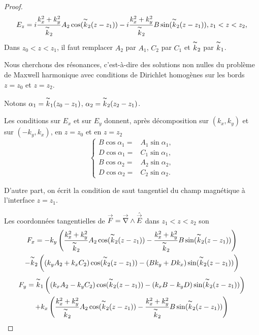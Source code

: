 \begin{proof}
    \[
    E_z=i\dfrac{k_x^2+k_y^2}{\overset{\thicksim}{k}_2}A_2\cos(\overset{\thicksim}{k}_2(z-z_1))-i\dfrac{k_x^2+k_y^2}{\overset{\thicksim}{k}_2}B\sin(\overset{\thicksim}{k}_2(z-z_1)), z_1<z<z_2,
    \]
    Dans \(z_0<z<z_1\), il faut remplacer \(A_2\) par \(A_1\), \(C_2\) par \(C_1\) et \(\overset{\thicksim}{k}_2\) par \(\overset{\thicksim}{k}_1\).

    Nous cherchons des résonances, c'est-à-dire des solutions non nulles du problème de Maxwell harmonique avec conditions de Dirichlet homogènes sur les bords \(z=z_0\) et \(z=z_2\).

    Notons \(\alpha_1=\overset{\thicksim}{k}_1(z_0-z_1)\), \(\alpha_2=\overset{\thicksim}{k}_2(z_2-z_1)\).

    Les conditions sur \(E_x\) et sur \(E_y\) donnent, après décomposition sur \((k_x,k_y)\) et sur \((-k_y,k_x)\), en \(z=z_0\) et en \(z=z_2\)
    \[
    \left\{
    \begin{aligned}
    B\cos \alpha_1={}& A_1\sin \alpha_1,
    \\
    D\cos \alpha_1={}& C_1\sin \alpha_1,
    \\
    B\cos \alpha_2={}& A_2\sin \alpha_2,
    \\
    D\cos \alpha_2={}& C_2\sin \alpha_2.
    \end{aligned}
    \right.
    \]

    D'autre part, on écrit la condition de saut tangentiel du champ magnétique à l'interface \(z=z_1\).

    Les coordonnées tangentielles de \({\overset{\rightarrow}{F}} = {\overset{\rightarrow}{\nabla}}\wedge \hat{{\overset{\rightarrow}{E}}}\) dans \(z_1<z<z_2\) son
    \begin{multline*}
    F_x = -k_y\left(\dfrac{k_x^2+k_y^2}{\overset{\thicksim}{k}_2}A_2\cos(\overset{\thicksim}{k}_2(z-z_1))-\dfrac{k_x^2+k_y^2}{\overset{\thicksim}{k}_2}B\sin(\overset{\thicksim}{k}_2(z-z_1))\right)
    \\
    -\overset{\thicksim}{k}_2\left((k_yA_2+k_xC_2)\cos(\overset{\thicksim}{k}_2(z-z_1))-(Bk_y+Dk_x)\sin(\overset{\thicksim}{k}_2(z-z_1))\right)
    \end{multline*}
    \begin{multline*}
    F_y = \overset{\thicksim}{k}_1\left((k_xA_2-k_yC_2)\cos(\overset{\thicksim}{k}_2(z-z_1))-(k_xB-k_yD)\sin(\overset{\thicksim}{k}_2(z-z_1))\right)
    \\
    +k_x\left(\dfrac{k_x^2+k_y^2}{\overset{\thicksim}{k}_2}A_2\cos(\overset{\thicksim}{k}_2(z-z_1))-\dfrac{k_x^2+k_y^2}{\overset{\thicksim}{k}_2}B\sin(\overset{\thicksim}{k}_2(z-z_1))\right)
    \end{multline*}


\end{proof}
